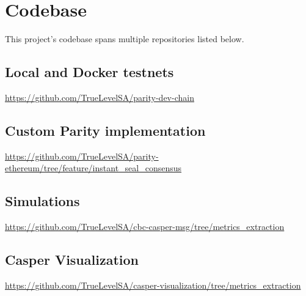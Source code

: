 \chapter{Codebase}
\label{chap:codebase}

This project's codebase spans multiple repositories listed below.

\section{Local and Docker testnets}
\url{https://github.com/TrueLevelSA/parity-dev-chain}

\section{Custom Parity implementation}
\url{https://github.com/TrueLevelSA/parity-ethereum/tree/feature/instant_seal_consensus}

\section{Simulations}
\url{https://github.com/TrueLevelSA/cbc-casper-msg/tree/metrics_extraction}

\section{Casper Visualization}
\label{sec:visualization}
\url{https://github.com/TrueLevelSA/casper-visualization/tree/metrics_extraction}
